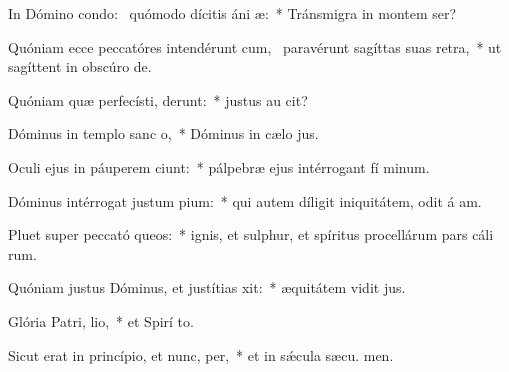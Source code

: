 \item In Dómino condo:~\pscross{} quómodo dícitis áni æ:~* Tránsmigra in montem  ser?
\item Quóniam ecce peccatóres intendérunt cum,~\pscross{} paravérunt sagíttas suas  retra,~* ut sagíttent in obscúro  de.
\item Quóniam quæ perfecísti, derunt:~* justus au  cit?
\item Dóminus in templo sanc o,~* Dóminus in cælo  jus.
\item Oculi ejus in páuperem ciunt:~* pálpebræ ejus intérrogant fí minum.
\item Dóminus intérrogat justum  pium:~* qui autem díligit iniquitátem, odit á am.
\item Pluet super peccató queos:~* ignis, et sulphur, et spíritus procellárum pars cáli rum.
\item Quóniam justus Dóminus, et justítias xit:~* æquitátem vidit  jus.
\item Glória Patri,  lio,~* et Spirí to.
\item Sicut erat in princípio, et nunc,  per,~* et in sǽcula sæcu. men.
